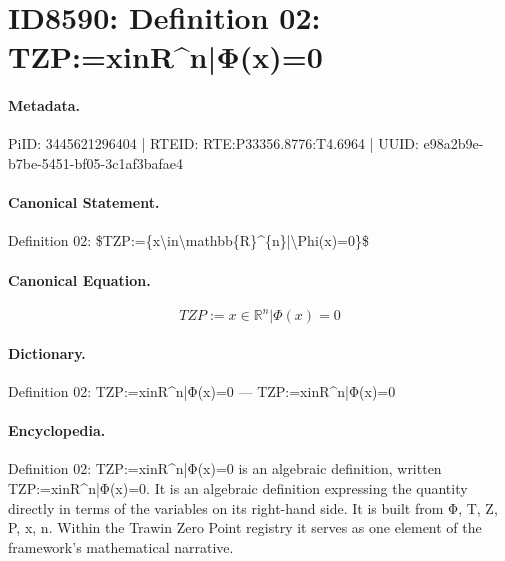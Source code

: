 \section*{ID8590: Definition 02: TZP:=xinR\textasciicircum{}n|Φ(x)=0}
\paragraph{Metadata.}
PiID: 3445621296404 | RTEID: RTE:P33356.8776:T4.6964 | UUID: e98a2b9e-b7be-5451-bf05-3c1af3bafae4

\paragraph{Canonical Statement.}
Definition 02: \$TZP:=\{x\textbackslash{}in\textbackslash{}mathbb\{R\}\textasciicircum{}\{n\}|\textbackslash{}Phi(x)=0\}\$

\paragraph{Canonical Equation.}
\[
TZP:={x\in\mathbb{R}^{n}|\Phi(x)=0}
\]

\paragraph{Dictionary.}
Definition 02: TZP:=xinR\textasciicircum{}n|Φ(x)=0 — TZP:=xinR\textasciicircum{}n|Φ(x)=0

\paragraph{Encyclopedia.}
Definition 02: TZP:=xinR\textasciicircum{}n|Φ(x)=0 is an algebraic definition, written TZP:=xinR\textasciicircum{}n|Φ(x)=0. It is an algebraic definition expressing the quantity directly in terms of the variables on its right-hand side. It is built from Φ, T, Z, P, x, n. Within the Trawin Zero Point registry it serves as one element of the framework's mathematical narrative.
